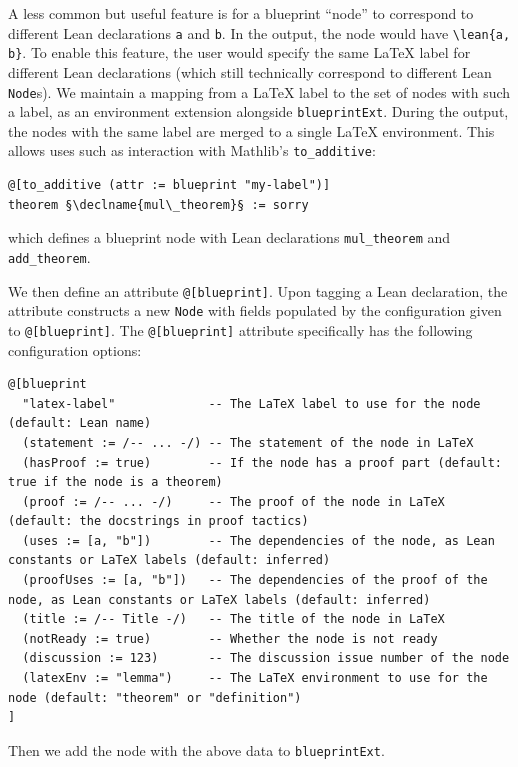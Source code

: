 \documentclass{article}
\newcommand{\leanblueprint}{leanblueprint\xspace}
\newcommand{\declname}[1]{{\ttfamily\color{declnamecolor}#1}}
\newcommand\latexcode{\lstinline[language={[latex]tex},keywordstyle=\ttfamily\color{black}]}
\newcommand\leancode{\lstinline[language=lean]}
\begin{document}
A less common but useful feature is for a blueprint ``node'' to correspond to different Lean declarations \leancode{a} and \leancode{b}. In the output, the node would have \latexcode|\lean{a, b}|. To enable this feature, the user would specify the same \LaTeX{} label for different Lean declarations (which still technically correspond to different Lean \leancode{Node}s). We maintain a mapping from a \LaTeX{} label to the set of nodes with such a label, as an environment extension alongside \leancode{blueprintExt}. During the output, the nodes with the same label are merged to a single \LaTeX{} environment. This allows uses such as interaction with Mathlib's \leancode{to_additive}:

\begin{lstlisting}
@[to_additive (attr := blueprint "my-label")]
theorem §\declname{mul\_theorem}§ := sorry
\end{lstlisting}

which defines a blueprint node with Lean declarations \leancode{mul_theorem} and \leancode{add_theorem}.

We then define an attribute \leancode{@[blueprint]}. Upon tagging a Lean declaration, the attribute constructs a new \leancode{Node} with fields populated by the configuration given to \leancode{@[blueprint]}. The \leancode{@[blueprint]} attribute specifically has the following configuration options:

\begin{lstlisting}
@[blueprint
  "latex-label"             -- The LaTeX label to use for the node (default: Lean name)
  (statement := /-- ... -/) -- The statement of the node in LaTeX
  (hasProof := true)        -- If the node has a proof part (default: true if the node is a theorem)
  (proof := /-- ... -/)     -- The proof of the node in LaTeX (default: the docstrings in proof tactics)
  (uses := [a, "b"])        -- The dependencies of the node, as Lean constants or LaTeX labels (default: inferred)
  (proofUses := [a, "b"])   -- The dependencies of the proof of the node, as Lean constants or LaTeX labels (default: inferred)
  (title := /-- Title -/)   -- The title of the node in LaTeX
  (notReady := true)        -- Whether the node is not ready
  (discussion := 123)       -- The discussion issue number of the node
  (latexEnv := "lemma")     -- The LaTeX environment to use for the node (default: "theorem" or "definition")
]
\end{lstlisting}

Then we add the node with the above data to \leancode{blueprintExt}.
\end{document}
